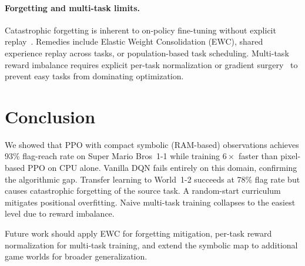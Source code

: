 \documentclass[10pt,a4paper,twocolumn]{article}
\begin{document}
\paragraph{Forgetting and multi-task limits.}
Catastrophic forgetting is inherent to on-policy fine-tuning without
explicit replay~\cite{kirkpatrick2017overcoming}.
Remedies include Elastic Weight Consolidation (EWC), shared experience
replay across tasks, or population-based task scheduling.
Multi-task reward imbalance requires explicit per-task normalization or
gradient surgery~\cite{yu2020gradient} to prevent easy tasks from
dominating optimization.

\section{Conclusion}

We showed that PPO with compact symbolic (RAM-based) observations achieves
93\% flag-reach rate on Super Mario Bros~1-1 while training $6\!\times$
faster than pixel-based PPO on CPU alone.
Vanilla DQN fails entirely on this domain, confirming the algorithmic gap.
Transfer learning to World~1-2 succeeds at 78\% flag rate but causes
catastrophic forgetting of the source task.
A random-start curriculum mitigates positional overfitting.
Naive multi-task training collapses to the easiest level due to reward
imbalance.

Future work should apply EWC for forgetting mitigation, per-task reward
normalization for multi-task training, and extend the symbolic map to
additional game worlds for broader generalization.


\end{document}
